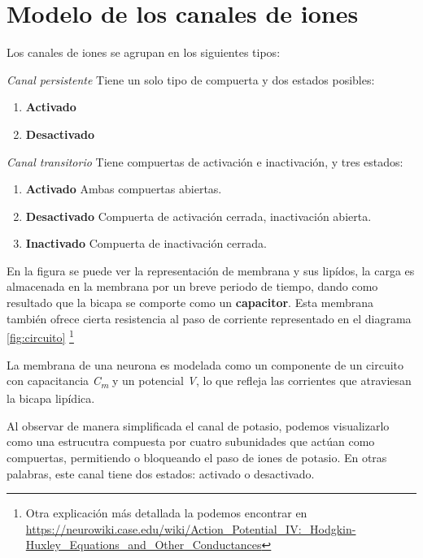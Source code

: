 \section{Modelo de los canales de iones}

Los canales de iones se agrupan en los siguientes tipos:


\begin{definition}
 \emph{Canal persistente} Tiene un solo tipo de compuerta y dos estados posibles:
 \begin{enumerate}
  \item \textbf{Activado}
  \item \textbf{Desactivado}
 \end{enumerate}

\end{definition}

\begin{definition}
 \emph{Canal transitorio} Tiene compuertas de activación e inactivación, y tres estados:
 \begin{enumerate}
  \item \textbf{Activado} Ambas compuertas abiertas.
  \item \textbf{Desactivado} Compuerta de activación cerrada, inactivación abierta.
  \item \textbf{Inactivado} Compuerta de inactivación cerrada.
 \end{enumerate}

\end{definition}



En la figura  se puede ver la representación de membrana y sus lipídos, la carga es almacenada en la membrana por un breve periodo de tiempo, dando como resultado que la bicapa se comporte como un \textbf{capacitor}. Esta membrana también ofrece cierta resistencia al paso de corriente representado en el diagrama \ref{fig:circuito} \footnote{Otra explicación más detallada la podemos encontrar en \url{https://neurowiki.case.edu/wiki/Action_Potential_IV:_Hodgkin-Huxley_Equations_and_Other_Conductances}} 

La membrana de una neurona es modelada como un componente de un circuito con capacitancia \emph{C\textsubscript{m}} y un potencial \emph{V}, lo que refleja las corrientes que atraviesan la bicapa lipídica. 

Al observar de manera simplificada el canal de potasio, podemos visualizarlo como una estrucutra compuesta por cuatro subunidades que actúan como compuertas, permitiendo o bloqueando el paso de iones de potasio. En otras palabras, este canal tiene dos estados: activado o desactivado.

